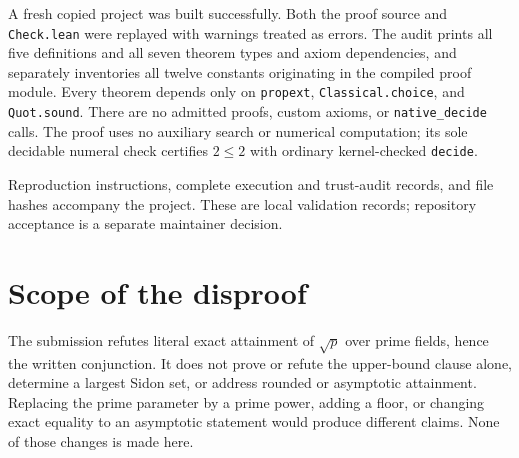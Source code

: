 \documentclass[11pt]{article}
\begin{document}
A fresh copied project was built successfully. Both the proof
source and \texttt{Check.lean} were replayed with warnings treated
as errors. The audit prints all five definitions and all seven
theorem types and axiom dependencies, and separately inventories
all twelve constants originating in the compiled proof module.
Every theorem depends only on \texttt{propext},
\texttt{Classical.choice}, and \texttt{Quot.sound}.
There are no admitted proofs, custom axioms, or
\texttt{native\_decide} calls. The proof uses no auxiliary search
or numerical computation; its sole decidable numeral check
certifies $2\le2$ with ordinary kernel-checked \texttt{decide}.

Reproduction instructions, complete execution and trust-audit
records, and file hashes accompany the project. These are local
validation records; repository acceptance is a separate maintainer
decision.

\section{Scope of the disproof}
The submission refutes literal exact attainment of $\sqrt p$ over
prime fields, hence the written conjunction. It does not prove
or refute the upper-bound clause alone, determine a largest Sidon
set, or address rounded or asymptotic attainment. Replacing the
prime parameter by a prime power, adding a floor, or changing
exact equality to an asymptotic statement would produce different
claims. None of those changes is made here.
\end{document}
